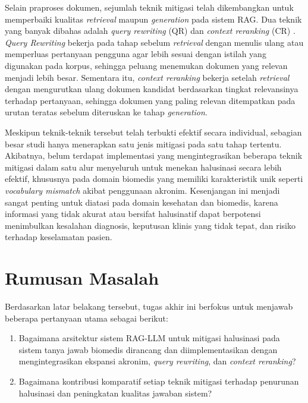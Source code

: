 Selain praproses dokumen, sejumlah teknik mitigasi telah dikembangkan untuk memperbaiki kualitas \textit{retrieval} maupun \textit{generation} pada sistem RAG. Dua teknik yang banyak dibahas adalah \textit{query rewriting} (QR) dan \textit{context reranking} (CR) \parencite{math2024hallucination}. \textit{Query Rewriting} bekerja pada tahap sebelum \textit{retrieval} dengan menulis ulang atau memperluas pertanyaan pengguna agar lebih sesuai dengan istilah yang digunakan pada korpus, sehingga peluang menemukan dokumen yang relevan menjadi lebih besar. Sementara itu, \textit{context reranking} bekerja setelah \textit{retrieval} dengan mengurutkan ulang dokumen kandidat berdasarkan tingkat relevansinya terhadap pertanyaan, sehingga dokumen yang paling relevan ditempatkan pada urutan teratas sebelum diteruskan ke tahap \textit{generation}.

Meskipun teknik-teknik tersebut telah terbukti efektif secara individual, sebagian besar studi hanya menerapkan satu jenis mitigasi pada satu tahap tertentu. Akibatnya, belum terdapat implementasi yang mengintegrasikan beberapa teknik mitigasi dalam satu alur menyeluruh untuk menekan halusinasi secara lebih efektif, khususnya pada domain biomedis yang memiliki karakteristik unik seperti \textit{vocabulary mismatch} akibat penggunaan akronim. Kesenjangan ini menjadi sangat penting untuk diatasi pada domain kesehatan dan biomedis, karena informasi yang tidak akurat atau bersifat halusinatif dapat berpotensi menimbulkan kesalahan diagnosis, keputusan klinis yang tidak tepat, dan risiko terhadap keselamatan pasien.

\section{Rumusan Masalah}

Berdasarkan latar belakang tersebut, tugas akhir ini berfokus untuk menjawab beberapa pertanyaan utama sebagai berikut:
\begin{enumerate}
    \item Bagaimana arsitektur sistem RAG-LLM untuk mitigasi halusinasi pada sistem tanya jawab biomedis dirancang dan diimplementasikan dengan mengintegrasikan ekspansi akronim, \textit{query rewriting}, dan \textit{context reranking}?
    \item Bagaimana kontribusi komparatif setiap teknik mitigasi terhadap penurunan halusinasi dan peningkatan kualitas jawaban sistem?
\end{enumerate}

